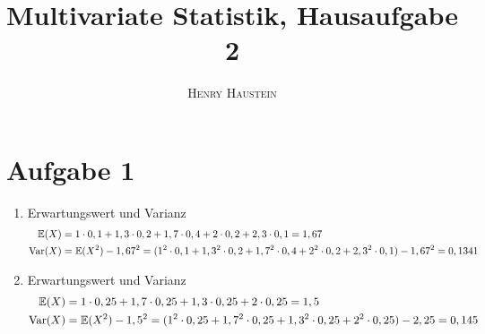 \documentclass{article}
\title{\textbf{Multivariate Statistik, Hausaufgabe 2}}
\author{\textsc{Henry Haustein}}
\date{}
\DeclareMathOperator{\Var}{Var}
\newcommand{\E}{\mathbb{E}}
\begin{document}
	\maketitle
	
	\section*{Aufgabe 1}
	\begin{enumerate}[label=(\alph*)]
		\item Erwartungswert und Varianz
		\begin{align}
			\E(X) &= 1\cdot 0,1 + 1,3 \cdot 0,2 + 1,7 \cdot 0,4 + 2 \cdot 0,2 + 2,3 \cdot 0,1 = 1,67 \notag \\
			\Var(X) &= \E(X^2) - 1,67^2 = (1^2\cdot 0,1 + 1,3^2 \cdot 0,2 + 1,7^2 \cdot 0,4 + 2^2 \cdot 0,2 + 2,3^2 \cdot 0,1) - 1,67^2 = 0,1341 \notag
		\end{align}
		\item Erwartungswert und Varianz
		\begin{align}
			\E(X) &= 1\cdot 0,25 + 1,7 \cdot 0,25 + 1,3 \cdot 0,25 + 2 \cdot 0,25 = 1,5 \notag \\
			\Var(X) &= \E(X^2) - 1,5^2 = (1^2\cdot 0,25 + 1,7^2 \cdot 0,25 + 1,3^2 \cdot 0,25 + 2^2 \cdot 0,25) - 2,25 = 0,145 \notag
		\end{align}
	\end{enumerate}
	
	
\end{document}
